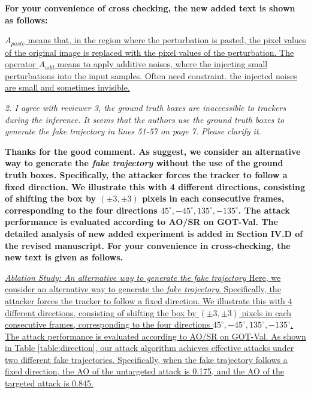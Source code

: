 \documentclass[12pt]{article}
\begin{document}
\textbf{For your convenience of cross checking, the new added text is shown as follows:}

\uline{
$A_{paste}$ means that, in the region where the perturbation is pasted, the pixel values of the original image is replaced with the pixel values of the perturbation.
The operator $A_{add}$ means to apply additive noises, where the injecting small perturbations into the input samples. Often need constraint. the injected noises are small and sometimes invisible.  
}


\textit{2. I agree with reviewer 3, the ground truth boxes are inaccessible to trackers during the inference. It seems that the authors use the ground truth boxes to generate the fake trajectory in lines 51-57 on page 7. Please clarify it.}

\textbf{
Thanks for the good comment. As suggest, we consider an alternative way to generate the \textit{fake trajectory} without the use of the ground truth boxes. Specifically, the attacker forces the tracker to follow a fixed direction. We illustrate this with 4 different directions, consisting of shifting the box by $(\pm 3, \pm 3)$ pixels in each consecutive frames, corresponding to the four directions $45^{\circ}, -45^{\circ}, 135^{\circ}, -135^{\circ}$.
The attack performance is evaluated according to AO/SR on GOT-Val.
The detailed analysis of new added experiment is added in Section IV.D of the revised manuscript. For your convenience in cross-checking, the new text is given as follows.}

\uline{
\textit{Ablation Study: An alternative way to generate the fake trajectory}  Here, we consider an alternative way to generate the \textit{fake trajectory}. Specifically, the attacker forces the tracker to follow a fixed direction. We illustrate this with 4 different directions, consisting of shifting the box by $(\pm 3, \pm 3)$ pixels in each consecutive frames, corresponding to the four directions $45^{\circ}, -45^{\circ}, 135^{\circ}, -135^{\circ}$.
The attack performance is evaluated according to AO/SR on GOT-Val.
As shown in Table \ref{table:direction}, our attack algorithm achieves effective attacks under two different fake trajectories. Specifically, when the fake trajectory follows a fixed direction, the AO of the untargeted attack is 0.175, and the AO of the targeted attack is 0.845.
}
\end{document}
